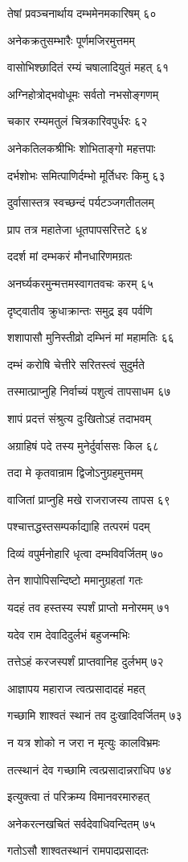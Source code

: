 तेषां प्रवञ्चनार्थाय दम्भमेनमकारिषम् ६०

अनेकक्रतुसम्भारैः पूर्णमजिरमुत्तमम्

वासोभिश्छादितं रम्यं चषालादियुतं महत् ६१

अग्निहोत्रोद्भवोधूमः सर्वतो नभसोङ्गणम्

चकार रम्यमतुलं चित्रकारिवपुर्धरः ६२

अनेकतिलकश्रीभिः शोभिताङ्गो महत्तपाः

दर्भशोभः समित्पाणिर्दम्भो मूर्तिधरः किमु ६३

दुर्वासास्तत्र स्वच्छन्दं पर्यटञ्जगतीतलम्

प्राप तत्र महातेजा धूतपापसरित्तटे ६४

ददर्श मां दम्भकरं मौनधारिणमग्रतः

अनर्घ्यकरमुन्मत्तमस्वागतवचः करम् ६५

दृष्ट्वातीव क्रुधाक्रान्तः समुद्र इव पर्वणि

शशापासौ मुनिस्तीव्रो दम्भिनं मां महामतिः ६६

दम्भं करोषि चेत्तीरे सरितस्त्वं सुदुर्मते

तस्मात्प्राप्नुहि निर्वाच्यं पशुत्वं तापसाधम ६७

शापं प्रदत्तं संश्रुत्य दुःखितोऽहं तदाभवम्

अग्राहिषं पदे तस्य मुनेर्दुर्वाससः किल ६८

तदा मे कृतवान्राम द्विजोऽनुग्रहमुत्तमम्

वाजितां प्राप्नुहि मखे राजराजस्य तापस ६९

पश्चात्तद्धस्तसम्पर्काद्याहि तत्परमं पदम्

दिव्यं वपुर्मनोहारि धृत्वा दम्भविवर्जितम् ७०

तेन शापोपिसन्दिष्टो ममानुग्रहतां गतः

यदहं तव हस्तस्य स्पर्शं प्राप्तो मनोरमम् ७१

यदेव राम देवादिदुर्लभं बहुजन्मभिः

तत्तेऽहं करजस्पर्शं प्राप्तवानिह दुर्लभम् ७२

आज्ञापय महाराज त्वत्प्रसादादहं महत्

गच्छामि शाश्वतं स्थानं तव दुःखादिवर्जितम् ७३

न यत्र शोको न जरा न मृत्युः कालविभ्रमः

तत्स्थानं देव गच्छामि त्वत्प्रसादान्नराधिप ७४

इत्युक्त्वा तं परिक्रम्य विमानवरमारुहत्

अनेकरत्नखचितं सर्वदेवाधिवन्दितम् ७५

गतोऽसौ शाश्वतस्थानं रामपादप्रसादतः

